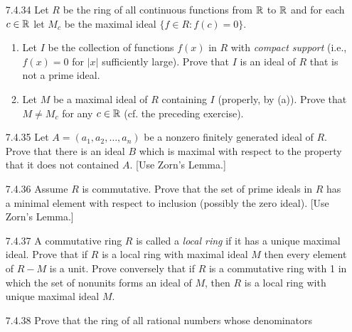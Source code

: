 \begin{enumerate}
   \item[7.4.34]  Let $R$ be the ring of all continuous functions from $\mathbb{R}$ to
                  $\mathbb{R}$ and for each $c \in \mathbb{R}$ let $M_c$ be the maximal ideal
                  $\{f \in R : f(c) = 0\}$.
                  \begin{enumerate}
                     \item Let $I$ be the collection of functions $f(x)$ in $R$
                           with \textit{compact support} (i.e., $f(x) = 0$ for
                           $|x|$ sufficiently large). Prove that $I$ is an ideal
                           of $R$ that is not a prime ideal.
                     \item Let $M$ be a maximal ideal of $R$ containing $I$
                           (properly, by (a)). Prove that $M \neq M_c$ for any
                           $c \in \mathbb{R}$ (cf. the preceding exercise).
                  \end{enumerate}
   \item[7.4.35]  Let $A = (a_1, a_2, \ldots, a_n)$ be a nonzero finitely
                  generated ideal of $R$. Prove that there is an ideal $B$ which
                  is maximal with respect to the property that it does not
                  contained $A$. [Use Zorn's Lemma.]
   \item[7.4.36]  Assume $R$ is commutative. Prove that the set of prime ideals
                  in $R$ has a minimal element with respect to inclusion
                  (possibly the zero ideal). [Use Zorn's Lemma.]
   \item[7.4.37]  A commutative ring $R$ is called a \textit{local ring} if it
                  has a unique maximal ideal. Prove that if $R$ is a local ring
                  with maximal ideal $M$ then every element of $R - M$ is a
                  unit. Prove conversely that if $R$ is a commutative ring with
                  1 in which the set of nonunits forms an ideal of $M$, then $R$
                  is a local ring with unique maximal ideal $M$.
   \item[7.4.38]  Prove that the ring of all rational numbers whose denominators

\end{enumerate}
